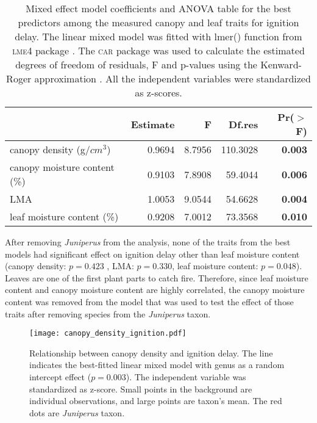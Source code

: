 \documentclass{ttuthes2007}
\newcommand{\pkg}[1]{\textsc{#1}}
\begin{document}
\begin{table}[ht]
  \centering
  \caption{Mixed effect model coefficients and ANOVA table for the best
    predictors among the measured canopy and leaf traits for ignition delay.
    The linear mixed model was fitted with lmer() function from \pkg{lme4}
    package \citep{bates2009package}. The \pkg{car} package
    \citep{fox2013hypothesis} was used to calculate the estimated degrees of
    freedom of residuals, F and p-values using the Kenward-Roger approximation
    \citep{kenward1997small}. All the independent variables were standardized
    as z-scores.}
  \begin{tabular}{lrrrr}
    \toprule
    & Estimate & F & Df.res & Pr($>$F) \\ 
    \midrule
    canopy density (g/{$cm^3$}) & 0.9694 & 8.7956  & 110.3028 & \textbf{0.003} \\ 
    canopy moisture content (\%) & 0.9103 & 7.8908 & 59.4044 & \textbf{0.006} \\ 
    LMA & 1.0053 & 9.0544  & 54.6628 & \textbf{0.004} \\  
    leaf moisture content (\%) & 0.9208 & 7.0012  & 73.3568 & \textbf{0.010} \\ 
    \bottomrule
  \end{tabular}
  \label{tab:fandpforig_delay}
\end{table}

After removing \emph{Juniperus} from the analysis, %
none of the traits from the best models had significant effect on ignition delay other than leaf moisture content (canopy density: $p = 0.423$ , 
LMA: $p = 0.330$, leaf moisture content: $p = 0.048$). Leaves are one of the first plant parts to catch fire. Therefore, since leaf moisture content and canopy moisture content are highly correlated, the canopy moisture content was removed from the model that was used to test the effect of those traits after removing species from the \emph{Juniperus} taxon.






\begin{figure}[ht]
    \centering
    \texttt{[image: canopy\_density\_ignition.pdf]}
    \caption{Relationship between canopy density and ignition delay. The line indicates the best-fitted linear mixed model with genus as a random intercept effect ($p  = 0.003$). The independent variable was standardized  as z-score. Small points in the background are individual observations, and large points are taxon's mean. The red dots are \emph{Juniperus} taxon.}
    \label{fig:canopy_density_ig_delay}
\end{figure}
\end{document}
